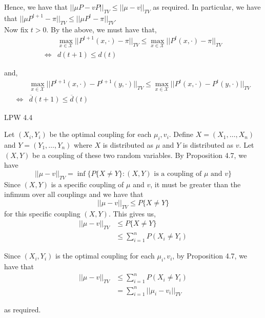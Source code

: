 \documentclass[12pt]{article}
\newenvironment{problem}[2][Problem]{\begin{trivlist}
\item[\hskip \labelsep {\bfseries #1}\hskip \labelsep {\bfseries #2.}]}{\end{trivlist}}
\begin{document}
Hence, we have that $||\mu P - vP||_{TV} \leq ||\mu - v||_{TV}$ as required. In particular, we have that $||\mu P^{t+1} - \pi||_{TV} \leq ||\mu P^t - \pi||_{TV}$.\\

Now fix $t > 0$. By the above, we must have that,
\begin{align*}
&\max_{x \in \mathcal{X}} ||P^{t+1}(x, \cdot) - \pi||_{TV} \leq \max_{x \in \mathcal{X}} ||P^{t}(x, \cdot) - \pi||_{TV}\\
\iff &d(t+1) \leq d(t)
\end{align*}

and,
\begin{align*}
&\max_{x \in \mathcal{X}} ||P^{t+1}(x, \cdot) - P^{t+1}(y, \cdot)||_{TV} \leq \max_{x \in \mathcal{X}} ||P^{t}(x, \cdot) - P^{t}(y, \cdot)||_{TV}\\
\iff &\overline{d}(t+1) \leq \overline{d}(t)
\end{align*}


\begin{problem}{III}
LPW 4.4
\end{problem}

Let $(X_i, Y_i)$ be the optimal coupling for each $\mu_i, v_i$. Define $X = (X_1, \ldots, X_n)$ and $Y = (Y_1, \ldots, Y_n)$ where $X$ is distributed as $\mu$ and $Y$ is distributed as $v$. Let $(X, Y)$ be a coupling of these two random variables. By Proposition 4.7, we have $$||\mu - v||_{TV} = \inf \{P\{X \neq Y\} : (X, Y) \text{ is a coupling of } \mu \text{ and } v\}$$ Since $(X, Y)$ is a specific coupling of $\mu$ and $v$, it must be greater than the infimum over all couplings and we have that $$||\mu - v||_{TV} \leq P\{X \neq Y\}$$ for this specific coupling $(X, Y)$. This gives us,
\begin{align*}
||\mu - v||_{TV} &\leq P\{X \neq Y\}\\
&\leq \sum_{i=1}^n P(X_i \neq Y_i)
\end{align*}

Since $(X_i, Y_i)$ is the optimal coupling for each $\mu_i, v_i$, by Proposition 4.7, we have that
\begin{align*}
||\mu - v||_{TV} &\leq \sum_{i=1}^n P(X_i \neq Y_i)\\
&= \sum_{i=1}^n ||\mu_i - v_i||_{TV}
\end{align*}

as required.
\end{document}
